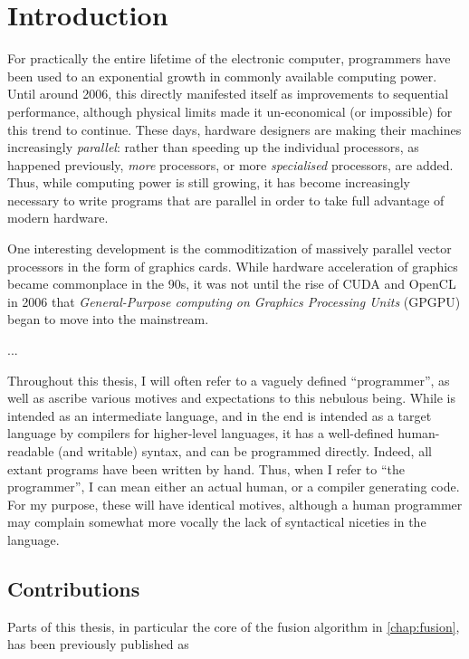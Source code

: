 \chapter{Introduction}

For practically the entire lifetime of the electronic computer,
programmers have been used to an exponential growth in commonly
available computing power.  Until around 2006, this directly
manifested itself as improvements to sequential performance, although
physical limits made it un-economical (or impossible) for this trend
to continue.  These days, hardware designers are making their machines
increasingly \textit{parallel}: rather than speeding up the individual
processors, as happened previously, \textit{more} processors, or more
\textit{specialised} processors, are added.  Thus, while computing
power is still growing, it has become increasingly necessary to write
programs that are parallel in order to take full advantage of modern
hardware.

One interesting development is the commoditization of massively
parallel vector processors in the form of graphics cards.  While
hardware acceleration of graphics became commonplace in the 90s, it
was not until the rise of CUDA and OpenCL in 2006 that
\textit{General-Purpose computing on Graphics Processing Units}
(GPGPU) began to move into the mainstream.

... 

Throughout this thesis, I will often refer to a vaguely defined
``programmer'', as well as ascribe various motives and expectations to
this nebulous being.  While \LO{} is intended as an intermediate
language, and in the end is intended as a target language by compilers
for higher-level languages, it has a well-defined human-readable (and
writable) syntax, and can be programmed directly.  Indeed, all extant
\LO{} programs have been written by hand.  Thus, when I refer to ``the
programmer'', I can mean either an actual human, or a compiler
generating \LO{} code.  For my purpose, these will have identical
motives, although a human programmer may complain somewhat more
vocally the lack of syntactical niceties in the language.

\section{Contributions}


Parts of this thesis, in particular the core of the fusion algorithm
in \cref{chap:fusion}, has been previously published as

